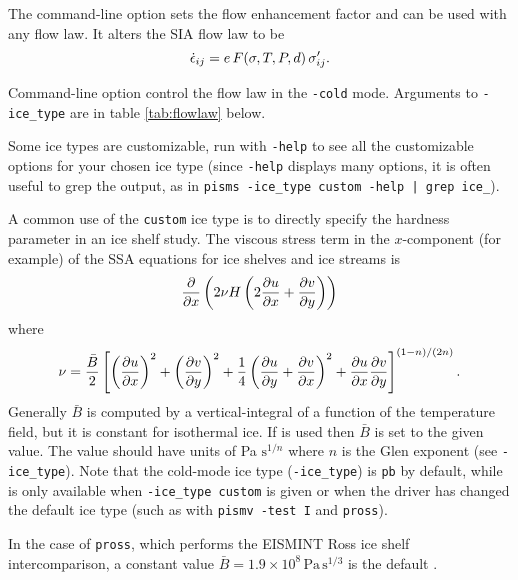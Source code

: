 The command-line option  sets the flow enhancement factor and can be used with any flow law.  It alters the SIA flow law to be
	$$\dot {\epsilon}_{ij} = e\, F(\sigma,T,P,d)\, \sigma_{ij}'.$$

Command-line option  control the flow law in the \texttt{-cold} mode.  Arguments to \texttt{-ice_type} are in table \ref{tab:flowlaw} below.

Some ice types are customizable, run with \texttt{-help} to see all the customizable options for your chosen ice type (since \texttt{-help} displays many options, it is often useful to grep the output, as in \texttt{pisms -ice_type custom -help | grep ice_}).

A common use of the \texttt{custom} ice type is to directly specify the hardness parameter in an ice shelf study.  The viscous stress term in the $x$-component (for example) of the SSA equations for ice shelves and ice streams is
	$$\frac{\partial }{\partial x}\left(2\nu H\left(2\frac{\partial u}{\partial x} + \frac{\partial v}{\partial y}\right)\right)$$
where 
	$$\nu = \frac{\bar B}{2} \left[\left(\frac{\partial u}{\partial x}\right)^2 + \left(\frac{\partial v}{\partial y}\right)^2 +
  \frac{1}{4} \left(\frac{\partial u}{\partial y} + \frac{\partial v}{\partial x}\right)^2 + \frac{\partial u}{\partial x}\frac{\partial v}{\partial y}\right]^{(1-n)/(2n)}.$$
Generally $\bar B$ is computed by a vertical-integral of a function of the temperature field, but it is constant for isothermal ice.  If  is used then $\bar B$ is set to the given value.  The value should have units of Pa $\text{s}^{1/n}$ where $n$ is the Glen exponent (see \texttt{-ice_type}).  Note that the cold-mode ice type (\texttt{-ice_type}) is \texttt{pb} by default, while  is only available when \texttt{-ice_type custom} is given or when the driver has changed the default ice type (such as with \texttt{pismv -test I} and \texttt{pross}).

In the case of \texttt{pross}, which performs the EISMINT Ross ice shelf intercomparison, a constant value $\bar B = 1.9 \times 10^8 \, \text{Pa}\, \text{s}^{1/3}$ is the default \cite{MacAyealetal}.


